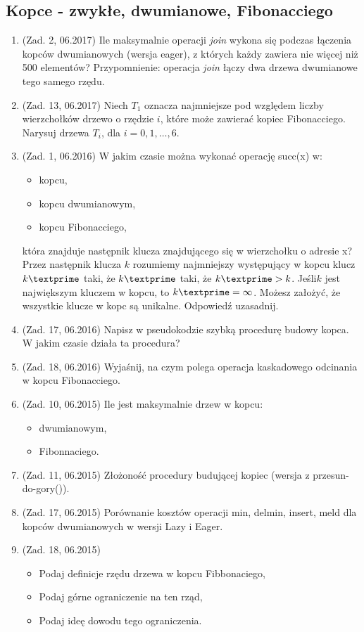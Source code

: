 \documentclass[10pt]{article}%
\begin{document}
\subsection*{Kopce - zwykłe, dwumianowe, Fibonacciego}
\begin{enumerate}
\item (Zad. 2, 06.2017) Ile maksymalnie operacji \textit{join} wykona się podczas łączenia kopców dwumianowych (wersja eager), z których każdy zawiera nie więcej niż 500 elementów? Przypomnienie: operacja \textit{join} łączy dwa drzewa dwumianowe tego samego rzędu.

\item (Zad. 13, 06.2017) Niech $T_{1}$ oznacza najmniejsze pod względem liczby wierzchołków drzewo o rzędzie $i$, które może zawierać kopiec Fibonacciego. Narysuj drzewa $T_{i}$, dla $i = 0,1,\ldots,6$.

\item (Zad. 1, 06.2016) W jakim czasie można wykonać operację succ(x) w:
\begin{itemize}
\item kopcu,
\item kopcu dwumianowym,
\item kopcu Fibonacciego,
\end{itemize}
która znajduje następnik klucza znajdującego się w wierzchołku o adresie x? Przez następnik klucza $k$ rozumiemy najmniejszy występujący w kopcu klucz $k\textprime$ taki, że $k\textprime$ taki, że $ k\textprime > k$. Jeśli$k$ jest największym kluczem w kopcu, to $k\textprime = \infty$. Możesz założyć, że wszystkie klucze w kopc są unikalne. Odpowiedź uzasadnij.

\item (Zad. 17, 06.2016) Napisz w pseudokodzie szybką procedurę budowy kopca. W jakim czasie działa ta procedura?

\item (Zad. 18, 06.2016) Wyjaśnij, na czym polega operacja kaskadowego odcinania w kopcu Fibonacciego.

\item (Zad. 10, 06.2015) Ile jest maksymalnie drzew w kopcu:
\begin{itemize}
\item dwumianowym,
\item Fibonnaciego.
\end{itemize}

\item (Zad. 11, 06.2015) Złożoność procedury budującej kopiec (wersja z przesun-do-gory()).

\item (Zad. 17, 06.2015) Porównanie kosztów operacji { min, delmin, insert, meld } dla kopców dwumianowych w wersji Lazy i Eager.

\item (Zad. 18, 06.2015) 
\begin{itemize}
\item Podaj definicje rzędu drzewa w kopcu Fibbonaciego, 
\item Podaj górne ograniczenie na ten rząd, 
\item Podaj ideę dowodu tego ograniczenia. 
\end{itemize}
\end{enumerate}
\end{document}
